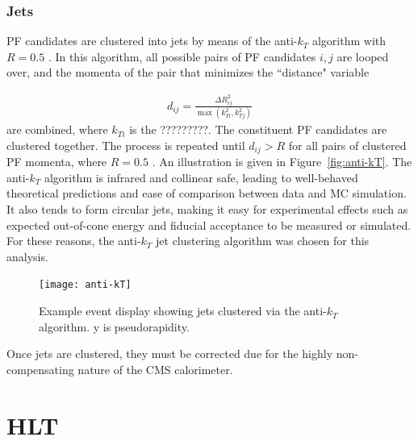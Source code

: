 \documentclass[dissertation.tex]{subfiles}
\begin{document}
\subsubsection{Jets}
\label{sec:Jets}

PF candidates are clustered into jets by means of the anti-$k_{T}$ algorithm with $R = 0.5$ \cite{AK5}.  In this algorithm, all possible pairs of PF candidates $i, j$ are looped over, and the momenta of the pair that minimizes the ``distance" variable

\begin{eqnarray}
d_{ij} = \frac{\Delta R_{ij}^{2}}{\max(k_{Ti}^{2}, k_{Tj}^{2})}
\end{eqnarray}
are combined, where $k_{Ti}$ is the ?????????.  The constituent PF candidates are clustered together.  The process is repeated until $d_{ij} > R$ for all pairs of clustered PF momenta, where $R = 0.5$ \cite{Salam_talk}.  An illustration is given in Figure~\ref{fig:anti-kT}.  The anti-$k_{T}$ algorithm is infrared and collinear safe, leading to well-behaved theoretical predictions and ease of comparison between data and MC simulation.  It also tends to form circular jets, making it easy for experimental effects such as expected out-of-cone energy and fiducial acceptance to be measured or simulated.  For these reasons, the anti-$k_{T}$ jet clustering algorithm was chosen for this analysis.

\begin{figure}
	\centering
	\texttt{[image: anti-kT]}
	\caption{Example event display showing jets clustered via the anti-$k_{T}$ algorithm.  y is pseudorapidity.}
	\label{fig:isolation_cones}
\end{figure}


Once jets are clustered, they must be corrected due for the highly non-compensating nature of the CMS calorimeter.


\section{HLT}
\label{sec:HLT}
\end{document}
